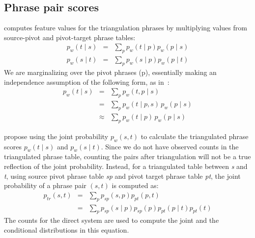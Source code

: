 \documentclass[11pt]{article}
\begin{document}
\subsection{Phrase pair scores}
\label{sec:phrase_scores}

 \cite{Utiyama:07} computes feature values for the triangulation phrases by multiplying values from source-pivot and pivot-target phrase tables:
	\begin{eqnarray} 
	    \label{eq:forward}
        p_w(t \mid s) &=& \sum_{p} p_w(t \mid p) p_w(p \mid s) \\
        \label{eq:backward}
        p_w(s \mid t) &=& \sum_{p} p_w(s \mid p) p_w(p \mid t)
	\end{eqnarray}
	We are marginalizing over the pivot phrases (p), essentially making an independence assumption of the following form, as in~\cite{Cohn:07}:  
	\begin{eqnarray*}
		p_w(t \mid s)&=&\sum_{p}{p_w(t, p \mid s)}\\
		&=& \sum_{p}{p_w(t \mid p, s)\,p_w(p \mid s)}\\
		&\approx& \sum_{p}{p_w(t \mid p)\,p_w(p \mid s)}
	\end{eqnarray*}

\label{sec:joint}
	\cite{Cohn:07} propose using the joint probability $p_{w}(s, t)$ to calculate the triangulated phrase scores $p_{w}(t \mid s)$ and $p_{w}(s \mid t)$. Since we do not have observed counts in the triangulated phrase table, counting the pairs after triangulation will not be a true reflection of the joint probability. Instead, for a triangulated table between \emph{s} and \emph{t}, using source pivot phrase table \emph{sp} and pivot target phrase table \emph{pt}, the joint probability of a phrase pair $(s, t)$ is computed as: 
	\begin{eqnarray*}
		p_{tr}(s, t) &=& \sum_{p}p_{sp}(s, p) p_{pt}(p, t) \\
				&=& \sum_{p}p_{sp}(s \mid p) p_{sp}(p) p_{pt}(p \mid t) p_{pt}(t)
	\end{eqnarray*} 
	The counts for the direct system are used to compute the joint and the conditional distributions in this equation.
	
\end{document}
